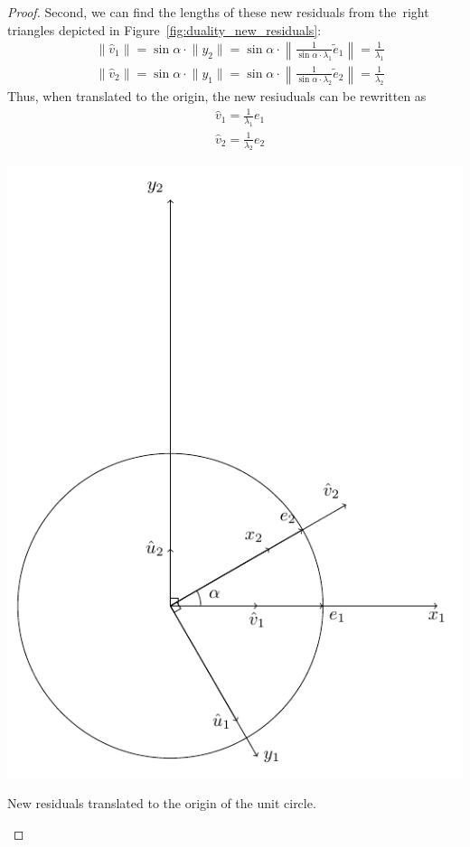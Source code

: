 \begin{proof}
Second, we can find the lengths of these new residuals from the~right
triangles depicted in Figure~\ref{fig:duality_new_residuals}:
\begin{align*}
& \lVert \hat{v}_1 \rVert = \sin \alpha \cdot \lVert y_2 \rVert = \sin \alpha \cdot \left\lVert \frac{1}{\sin \alpha \cdot \lambda_1} \tilde{e}_1 \right\rVert = \frac{1}{\lambda_1} \\
& \lVert \hat{v}_2 \rVert = \sin \alpha \cdot \lVert y_1 \rVert = \sin \alpha \cdot \left\lVert \frac{1}{\sin \alpha \cdot \lambda_2} \tilde{e}_2 \right\rVert = \frac{1}{\lambda_2}
\end{align*}
Thus, when translated to the origin, the new resiuduals can be rewritten as
\begin{align*}
& \hat{v}_1 = \frac{1}{\lambda_1} e_1 \\
& \hat{v}_2 = \frac{1}{\lambda_2} e_2
\end{align*}

\begin{marginfigure}
\includegraphics[scale=0.65]{figures/02_duality_final.pdf}
\label{fig:duality_final}
\caption{New residuals translated to the origin of the unit circle.}
\end{marginfigure}


\end{proof}

